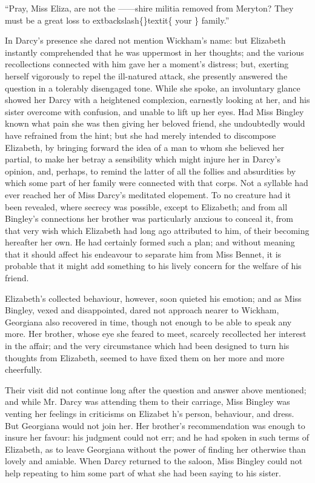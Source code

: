 \documentclass[10pt]{book}
\begin{document}
   “Pray, Miss Eliza, are not the ——shire militia removed from Meryton?
They must be a great loss to
   	extbackslash\{\}textit\{
    your
   \}
   family.”
  

   In Darcy’s presence she dared not mention Wickham’s name: but Elizabeth
instantly comprehended that he was uppermost in her thoughts; and the
various recollections connected with him gave her a moment’s distress;
but, exerting herself vigorously to repel the ill-natured attack, she
presently answered the question in a tolerably disengaged tone. While
she spoke, an involuntary glance showed her Darcy with a heightened
complexion, earnestly looking at her, and his sister overcome with
confusion, and unable to lift up her eyes.
   Had Miss Bingley known what
pain she was then giving her beloved friend, she undoubtedly would have
refrained from the hint; but she had merely intended to discompose
Elizabeth, by bringing forward the idea of a man to whom she believed
her partial, to make her betray a sensibility which might injure her in
Darcy’s opinion, and, perhaps, to remind the latter of all the follies
and absurdities by which some part of her family were connected with
that corps. Not a syllable had ever reached her of Miss Darcy’s
meditated elopement. To no creature had it been revealed, where secrecy
was possible, except to Elizabeth; and from all Bingley’s connections
her brother was particularly anxious to conceal it, from that very wish
which Elizabeth had long ago attributed to him, of their becoming
hereafter her own. He had certainly formed such a plan; and without
meaning that it should affect his endeavour to separate him from Miss
Bennet, it is probable that it might add something to his lively concern
for the welfare of his friend.
  

   Elizabeth’s collected behaviour, however, soon quieted his emotion; and
as Miss Bingley, vexed and disappointed, dared not approach nearer to
Wickham, Georgiana also recovered in time, though not enough to be able
to speak any more. Her brother, whose eye she feared to meet, scarcely
recollected her interest in the affair; and the very circumstance which
had been designed to turn his thoughts from Elizabeth, seemed to have
fixed them on her more and more cheerfully.
  

   Their visit did not continue long after the question and answer above
mentioned; and while Mr. Darcy was attending them to their carriage,
Miss Bingley was venting her feelings in criticisms on Elizabet
   h’s
person, behaviour, and dress. But Georgiana would not join her. Her
brother’s recommendation was enough to insure her favour: his judgment
could not err; and he had spoken in such terms of Elizabeth, as to leave
Georgiana without the power of finding her otherwise than lovely and
amiable. When Darcy returned to the saloon, Miss Bingley could not help
repeating to him some part of what she had been saying to his sister.
  
\end{document}
